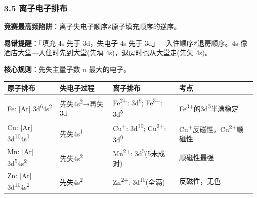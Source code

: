 \subsubsection{3.5 离子电子排布}\label{ux79bbux5b50ux7535ux5b50ux6392ux5e03}

\textbf{竞赛最高频陷阱}：离子失电子顺序≠原子填充顺序的逆序。

\textbf{易错提醒}：「填充 4s 先于 3d，失电子 4s 先于 3d」---入住顺序≠退房顺序。4s 像酒店大堂---入住时先到大堂(先填 4s)，退房时也从大堂走(先失 4s)。

\textbf{核心规则}：先失主量子数 \(n\) 最大的电子。

{\def\LTcaptype{none} %
\begin{longtable}[]{@{}
  >{\raggedright\arraybackslash}p{}
  >{\raggedright\arraybackslash}p{}
  >{\raggedright\arraybackslash}p{}
  >{\raggedright\arraybackslash}p{}@{}}
\toprule\noalign{}
\begin{minipage}[b]{\linewidth}\raggedright
原子排布
\end{minipage} & \begin{minipage}[b]{\linewidth}\raggedright
失电子过程
\end{minipage} & \begin{minipage}[b]{\linewidth}\raggedright
离子排布
\end{minipage} & \begin{minipage}[b]{\linewidth}\raggedright
考点
\end{minipage} \\
\midrule\noalign{}
\endhead
\bottomrule\noalign{}
\endlastfoot
Fe: {[}Ar{]} 3d\textsuperscript{6}4s\textsuperscript{2} & 先失4s\textsuperscript{2}→再失3d & Fe\textsuperscript{2+}: 3d\textsuperscript{6}; Fe\textsuperscript{3+}: 3d\textsuperscript{5} & Fe\textsuperscript{3+}的3d\textsuperscript{5}半满稳定 \\
Cu: {[}Ar{]} 3d\textsuperscript{10}4s\textsuperscript{1} & 先失4s\textsuperscript{1} & Cu\textsuperscript{+}: 3d\textsuperscript{10}; Cu\textsuperscript{2+}: 3d\textsuperscript{9} & Cu\textsuperscript{+}反磁性，Cu\textsuperscript{2+}顺磁性 \\
Mn: {[}Ar{]} 3d\textsuperscript{5}4s\textsuperscript{2} & 先失4s\textsuperscript{2} & Mn\textsuperscript{2+}: 3d\textsuperscript{5}(5未成对) & 顺磁性最强 \\
Zn: {[}Ar{]} 3d\textsuperscript{10}4s\textsuperscript{2} & 先失4s\textsuperscript{2} & Zn\textsuperscript{2+}: 3d\textsuperscript{10}(全满) & 反磁性，无色 \\
\end{longtable}
}

